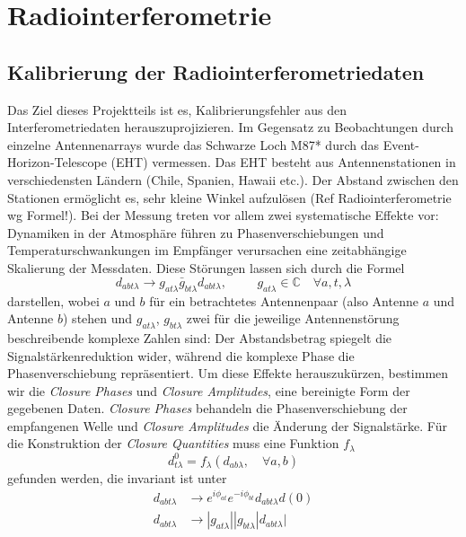 
\section{Radiointerferometrie}
\subsection{Kalibrierung der Radiointerferometriedaten}
Das Ziel dieses Projektteils ist es, Kalibrierungsfehler aus den Interferometriedaten herauszuprojizieren. Im Gegensatz zu Beobachtungen durch einzelne Antennenarrays wurde das Schwarze Loch M87* durch das Event-Horizon-Telescope (EHT) vermessen. Das EHT besteht aus Antennenstationen in verschiedensten Ländern (Chile, Spanien, Hawaii etc.). Der Abstand zwischen den Stationen ermöglicht es, sehr kleine Winkel aufzulösen (Ref Radiointerferometrie wg Formel!).
Bei der Messung treten vor allem zwei systematische Effekte vor: Dynamiken in der Atmosphäre führen zu Phasenverschiebungen und Temperaturschwankungen im Empfänger verursachen eine zeitabhängige Skalierung der Messdaten. Diese Störungen lassen sich durch die Formel
$$d_{abt\lambda}\rightarrow g_{at\lambda} \bar{g}_{bt\lambda}d_{abt\lambda}, \hspace{1cm} g_{at \lambda} \in \mathbb{C} \quad \forall a,t,\lambda $$
darstellen, wobei $a$ und $b$ für ein betrachtetes Antennenpaar (also Antenne $a$ und Antenne $b$) stehen und $g_{at\lambda}$,  $g_{bt\lambda}$ zwei für die jeweilige Antennenstörung beschreibende komplexe Zahlen sind: Der Abstandsbetrag spiegelt die Signalstärkenreduktion wider, während die komplexe Phase die Phasenverschiebung repräsentiert.
Um diese Effekte herauszukürzen, bestimmen wir die \emph{Closure Phases} und \emph{Closure Amplitudes}, eine bereinigte Form der gegebenen Daten. \emph{Closure Phases} behandeln die Phasenverschiebung der empfangenen Welle und \emph{Closure Amplitudes} die Änderung der Signalstärke. Für die Konstruktion der \emph{Closure Quantities} muss eine Funktion $f_{\lambda}$
\begin{equation}
d^0_{t\lambda}=f_{\lambda}(d_{ab\lambda},\quad \forall a,b)
\end{equation}
gefunden werden, die invariant ist unter
\begin{align}
d_{abt\lambda} &\rightarrow e^{i \phi_{at}} e^{-i\phi_{bt}} d_{abt\lambda}d(0)\\
d_{abt\lambda}&\rightarrow|g_{at\lambda}||g_{bt\lambda}|d_{abt\lambda}|
\end{align}
